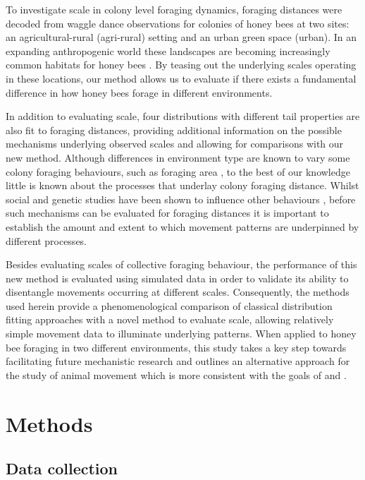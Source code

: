 \documentclass[11pt,usenames,dvipsnames,a4paper]{article}
\begin{document}
\begin{linenumbers}
To investigate scale in colony level foraging dynamics, foraging distances were decoded from waggle dance observations for colonies of honey bees at two sites: an agricultural-rural (agri-rural) setting and an urban green space (urban). In an expanding anthropogenic world these landscapes are becoming increasingly common habitats for honey bees \citep{Samuelson2018}. By teasing out the underlying scales operating in these locations, our method allows us to evaluate if there exists a fundamental difference in how honey bees forage in different environments. 

In addition to evaluating scale, four distributions with different tail properties are also fit to foraging distances, providing additional information on the possible mechanisms underlying observed scales and allowing for comparisons with our new method. Although differences in environment type are known to vary some colony foraging behaviours, such as foraging area \citep{Lecocq2015, Samuelson2018}, to the best of our knowledge little is known about the processes that underlay colony foraging distance. Whilst social and genetic studies have been shown to influence other behaviours \citep{Fewell1993, Page1998, Sherman2002, Jones2004, Gruter2009}, before such mechanisms can be evaluated for foraging distances it is important to establish the amount and extent to which movement patterns are underpinned by different processes.

Besides evaluating scales of collective foraging behaviour, the performance of this new method is evaluated using simulated data in order to validate its ability to disentangle movements occurring at different scales. Consequently, the methods used herein provide a phenomenological comparison of classical distribution fitting approaches with a novel method to evaluate scale, allowing relatively simple movement data to illuminate underlying patterns. When applied to honey bee foraging in two different environments, this study takes a key step towards facilitating future mechanistic research and outlines an alternative approach for the study of animal movement which is more consistent with the goals of \cite{Nathan2008} and \cite{Patterson2017}.
\end{linenumbers}
	
\section{Methods}

\subsection{Data collection}
\end{document}
